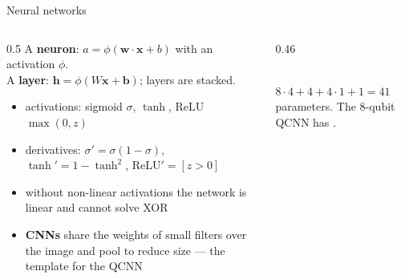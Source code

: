 \documentclass[aspectratio=169,11pt]{beamer}
\newcommand{\key}[1]{{\color{qdark}\textbf{#1}}}
\newcommand{\bx}{\mathbf x}
\begin{document}
\begin{frame}[label=fNN]{Neural networks}
  \begin{columns}[T]
    \begin{column}{0.5\textwidth}
      \small
      A \key{neuron}: $a = \phi(\mathbf w\cdot\bx + b)$ with an activation $\phi$.\\
      A \key{layer}: $\mathbf h = \phi(W\bx + \mathbf b)$; layers are stacked.
      \begin{itemize}\itemsep1pt
        \item activations: sigmoid $\sigma$, $\tanh$, ReLU $\max(0, z)$
        \item derivatives: $\sigma' = \sigma(1 - \sigma)$, $\tanh' = 1 - \tanh^2$, ReLU$' = [z > 0]$
        \item without non-linear activations the network is linear and cannot solve XOR
        \item \key{CNNs} share the weights of small filters over the image and pool to reduce size --- the template for the QCNN
      \end{itemize}
    \end{column}
    \begin{column}{0.46\textwidth}
      \centering
      \\
      {\scriptsize $8\cdot4 + 4 + 4\cdot1 + 1 = 41$ parameters. The 8-qubit QCNN has \numnparams.}
    \end{column}
  \end{columns}
\end{frame}
\end{document}
